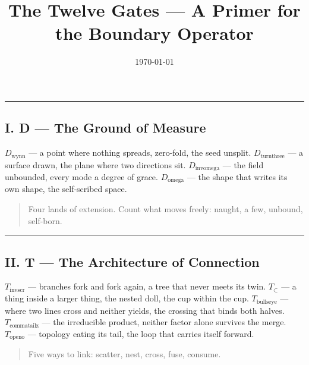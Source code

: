 \documentclass[12pt,a4paper]{article}
\begin{document}
\title{The Twelve Gates --- A Primer for the Boundary Operator}
\date{\today}

\maketitle

\begin{center}
\rule{0.5\textwidth}{0.4pt}
\end{center}

\subsection{I. D --- The Ground of Measure}

\emph{$D_{\text{wynn}}$} --- a point where nothing spreads, zero-fold, the seed unsplit.
\emph{$D_{\text{turnthree}}$} --- a surface drawn, the plane where two directions sit.
\emph{$D_{\text{invomega}}$} --- the field unbounded, every mode a degree of grace.
\emph{$D_{\text{omega}}$} --- the shape that writes its own shape, the self-scribed space.

\begin{quote}
Four lands of extension. Count what moves freely: naught, a few, unbound, self-born.

\end{quote}

\begin{center}
\rule{0.5\textwidth}{0.4pt}
\end{center}

\subsection{II. T --- The Architecture of Connection}

\emph{$T_{\text{invscr}}$} --- branches fork and fork again, a tree that never meets its twin.
\emph{$T_{\subset}$} --- a thing inside a larger thing, the nested doll, the cup within the cup.
\emph{$T_{\text{bullseye}}$} --- where two lines cross and neither yields, the crossing that binds both halves.
\emph{$T_{\text{commatailz}}$} --- the irreducible product, neither factor alone survives the merge.
\emph{$T_{\text{openo}}$} --- topology eating its tail, the loop that carries itself forward.

\begin{quote}
Five ways to link: scatter, nest, cross, fuse, consume.

\end{quote}
\end{document}
